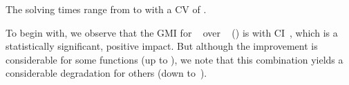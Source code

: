 %
The solving times range from
\printMinSolvingTime{
  \SolvTechEnableOnlyGoodPresolvingPrePlusSolvingTimeSpeedupNonePrePlusSolvingTimeAvgMin,
  \SolvTechEnableOnlyGoodPresolvingPrePlusSolvingTimeSpeedupPrePlusSolvingTimeAvgMin,
  \SolvTechDisableBadPresolvingPrePlusSolvingTimeSpeedupPrePlusSolvingTimeAvgMin,
  \SolvTechDisableAllPresolvingPrePlusSolvingTimeSpeedupPrePlusSolvingTimeAvgMin
} to
\printMaxSolvingTime{
  \SolvTechEnableOnlyGoodPresolvingPrePlusSolvingTimeSpeedupNonePrePlusSolvingTimeAvgMax,
  \SolvTechEnableOnlyGoodPresolvingPrePlusSolvingTimeSpeedupPrePlusSolvingTimeAvgMax,
  \SolvTechDisableBadPresolvingPrePlusSolvingTimeSpeedupPrePlusSolvingTimeAvgMax,
  \SolvTechDisableAllPresolvingPrePlusSolvingTimeSpeedupPrePlusSolvingTimeAvgMax
} with a \gls{CV} of
\numMaxOf{
  \SolvTechEnableOnlyGoodPresolvingPrePlusSolvingTimeSpeedupNonePrePlusSolvingTimeCvMax,
  \SolvTechEnableOnlyGoodPresolvingPrePlusSolvingTimeSpeedupPrePlusSolvingTimeCvMax,
  \SolvTechDisableBadPresolvingPrePlusSolvingTimeSpeedupPrePlusSolvingTimeCvMax,
  \SolvTechDisableAllPresolvingPrePlusSolvingTimeSpeedupPrePlusSolvingTimeCvMax
}.

To begin with, we observe that the \gls{GMI} for ~ over ~
() is \printGMI{%
  \SolvTechEnableOnlyGoodPresolvingPrePlusSolvingTimeSpeedupPrePlusSolvingTimeRegularSpeedupGmean%
} with \gls{CI}~\printGMICI{%
  \SolvTechEnableOnlyGoodPresolvingPrePlusSolvingTimeSpeedupPrePlusSolvingTimeRegularSpeedupCiMin%
}{%
  \SolvTechEnableOnlyGoodPresolvingPrePlusSolvingTimeSpeedupPrePlusSolvingTimeRegularSpeedupCiMax%
}, which is a statistically significant, positive impact.
%
But although the improvement is considerable for some \glspl{function} (up to
\printSpeedup{%
  \SolvTechEnableOnlyGoodPresolvingPrePlusSolvingTimeSpeedupPrePlusSolvingTimeZeroCenteredSpeedupMax%
}), we note that this combination yields a considerable degradation for others
(down
to~\printSpeedup{%
  \SolvTechEnableOnlyGoodPresolvingPrePlusSolvingTimeSpeedupPrePlusSolvingTimeZeroCenteredSpeedupMin%
}).

